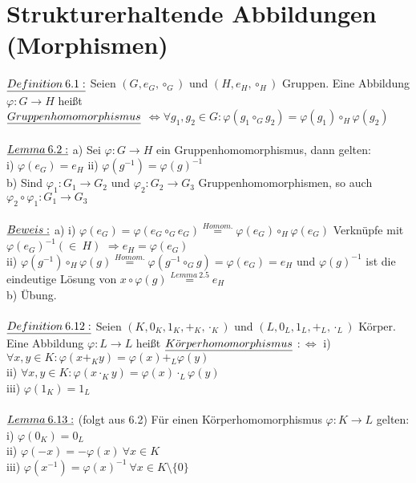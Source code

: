 \documentclass[fleqn, a4paper, 11pt]{article}
\begin{document}
\section{Strukturerhaltende Abbildungen (Morphismen)}

$\uline{Definition\:6.1:}$ Seien $(G,e_G,\circ_G)$ und $(H,e_H,\circ_H)$ Gruppen. Eine Abbildung $\varphi:G\rightarrow H$ hei\ss{}t \\$\uline{Gruppenhomomorphismus}$ $\Leftrightarrow\forall g_1,g_2\in G:\varphi(g_1\circ_G g_2)=\varphi(g_1)\circ_H \varphi(g_2)$\\
\\
$\uline{Lemma\:6.2:}$ a) Sei $\varphi:G\rightarrow H$ ein Gruppenhomomorphismus, dann gelten:\\
i) $\varphi(e_G)=e_H$ \quad ii) $\varphi(g^{-1})=\varphi(g)^{-1}$\\
b) Sind $\varphi_1 :G_1\rightarrow G_2$ und $\varphi_2 :G_2\rightarrow G_3$ Gruppenhomomorphismen, so auch $\varphi_2\circ\varphi_1 :G_1\rightarrow G_3$\\
\\
$\uline{Beweis:}$ a) i) $\varphi(e_G)=\varphi(e_G\circ_G e_G)\stackrel{Homom.}{=}\varphi(e_G)\circ_H\varphi(e_G)$ Verkn\"upfe mit $\varphi(e_G)^{-1}(\in\:H)$ $\Rightarrow e_H=\varphi(e_G)$\\
ii) $\varphi(g^{-1})\circ_H\varphi(g)\stackrel{Homom.}{=} \varphi(g^{-1}\circ_G g)=\varphi(e_G)=e_H$ und $\varphi(g)^{-1}$ ist die eindeutige L\"osung von $x\circ\varphi(g)\stackrel{Lemma\:2.5}{=}e_H$\\
b) \"Ubung.\\
\\
$\uline{Definition\:6.12:}$ Seien $(K,0_K,1_K,+_K,\cdot_K)$ und $(L,0_L,1_L,+_L,\cdot_L)$ K\"orper. Eine Abbildung $\varphi:L\rightarrow L$ hei\ss{}t $\uline{K\ddot{o}rperhomomorphismus}$ $:\Leftrightarrow$ i) $\forall x,y\in K:\varphi(x+_K y)=\varphi(x)+_L\varphi(y)$\\
ii) $\forall x,y\in K:\varphi(x\cdot_K y)=\varphi(x)\cdot_L\varphi(y)$\\
iii) $\varphi(1_K)=1_L$\\
\\
$\uline{Lemma\:6.13:}$ (folgt aus 6.2) F\"ur einen K\"orperhomomorphismus $\varphi:K\rightarrow L$ gelten: i) $\varphi(0_K)=0_L$\\
ii) $\varphi(-x)=-\varphi(x) \: \forall x\in K$\\
iii) $\varphi(x^{-1})=\varphi(x)^{-1}\:\forall x\in K\setminus\{0\}$\\
\\
\end{document}
